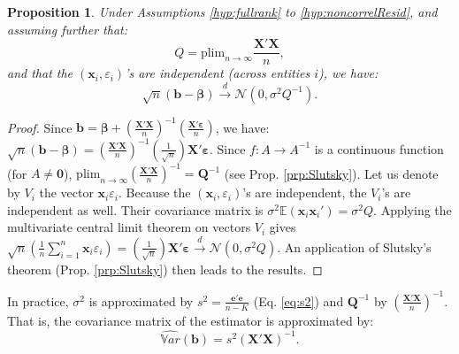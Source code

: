 \documentclass[
  12pt,
]{book}
\newtheorem{proposition}{Proposition}[chapter]
\theoremstyle{definition}
\theoremstyle{definition}
\theoremstyle{definition}
\theoremstyle{definition}
\theoremstyle{remark}
\begin{document}
\begin{proposition}
\protect\hypertarget{prp:asymptOLS}{}\label{prp:asymptOLS}Under Assumptions \ref{hyp:fullrank} to \ref{hyp:noncorrelResid}, and assuming further that:
\begin{equation}
Q = \mbox{plim}_{n \rightarrow \infty} \frac{\mathbf{X}'\mathbf{X}}{n},\label{eq:Qasympt}
\end{equation}
and that the \((\mathbf{x}_i,\varepsilon_i)\)'s are independent (across entities \(i\)), we have:
\begin{equation}
\sqrt{n}(\mathbf{b} - \boldsymbol\beta)\overset{d} {\rightarrow} \mathcal{N}\left(0,\sigma^2Q^{-1}\right).\label{eq:convgceOLS}
\end{equation}
\end{proposition}

\begin{proof}
Since \(\mathbf{b} = \boldsymbol\beta + \left( \frac{\mathbf{X}'\mathbf{X}}{n}\right)^{-1}\left(\frac{\mathbf{X}'\boldsymbol\varepsilon}{n}\right)\), we have: \(\sqrt{n}(\mathbf{b} - \boldsymbol\beta) = \left( \frac{\mathbf{X}'\mathbf{X}}{n}\right)^{-1} \left(\frac{1}{\sqrt{n}}\right)\mathbf{X}'\boldsymbol\varepsilon\). Since \(f:A \rightarrow A^{-1}\) is a continuous function (for \(A \ne \mathbf{0}\)), \(\mbox{plim}_{n \rightarrow \infty} \left(\frac{\mathbf{X}'\mathbf{X}}{n}\right)^{-1} = \mathbf{Q}^{-1}\) (see Prop. \ref{prp:Slutsky}). Let us denote by \(V_i\) the vector \(\mathbf{x}_i \varepsilon_i\). Because the \((\mathbf{x}_i,\varepsilon_i)\)'s are independent, the \(V_i\)'s are independent as well. Their covariance matrix is \(\sigma^2\mathbb{E}(\mathbf{x}_i \mathbf{x}_i')=\sigma^2Q\). Applying the multivariate central limit theorem on vectors \(V_i\) gives \(\sqrt{n}\left(\frac{1}{n}\sum_{i=1}^n \mathbf{x}_i \varepsilon_i\right) = \left(\frac{1}{\sqrt{n}}\right)\mathbf{X}'\boldsymbol\varepsilon \overset{d}{\rightarrow} \mathcal{N}(0,\sigma^2Q)\). An application of Slutsky's theorem (Prop. \ref{prp:Slutsky}) then leads to the results.
\end{proof}

In practice, \(\sigma^2\) is approximated by \(s^2=\frac{\mathbf{e}'\mathbf{e}}{n-K}\) (Eq. \eqref{eq:s2}) and \(\mathbf{Q}^{-1}\) by \(\left(\frac{\mathbf{X}'\mathbf{X}}{n}\right)^{-1}\). That is, the covariance matrix of the estimator is approximated by:
\begin{equation}
\boxed{\widehat{\mathbb{V}ar}(\mathbf{b}) = s^2 (\mathbf{X}'\mathbf{X})^{-1}.}\label{eq:sXX}
\end{equation}
\end{document}
